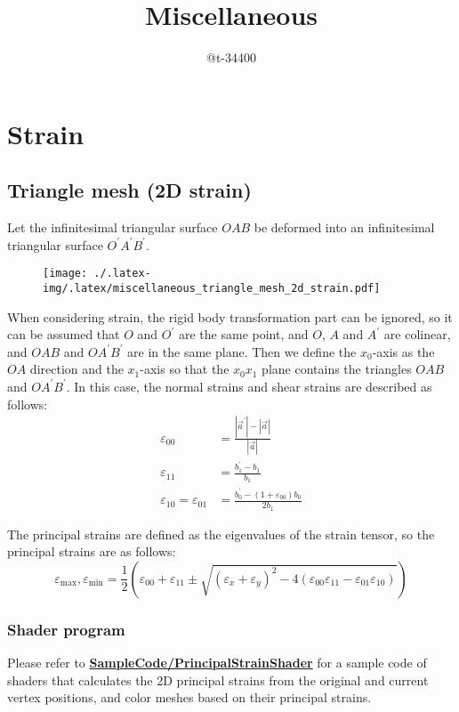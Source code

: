 \documentclass[]{article}
\title{Miscellaneous}
\author{@t-34400}
\theoremstyle{definition}
\begin{document}
\maketitle
\tableofcontents

\section{Strain}
\subsection{Triangle mesh (2D strain)}
Let the infinitesimal triangular surface $OAB$ be deformed into an infinitesimal triangular surface $O^\prime A^\prime B^\prime$. 
\begin{figure}[H]
    \centering
    \texttt{[image: ./.latex-img/.latex/miscellaneous\_triangle\_mesh\_2d\_strain.pdf]}
    \label{fig:infinitesimal_triangle_deformation_2d_strain}
\end{figure}
When considering strain, the rigid body transformation part can be ignored, so it can be assumed that $O$ and $O^\prime$ are the same point, and $O$, $A$ and $A^\prime$ are colinear, and $OAB$ and $O A^\prime B^\prime$ are in the same plane. 
Then we define the $x_0$-axis as the $OA$ direction and the $x_1$-axis so that the $x_0x_1$ plane contains the triangles $OAB$ and $OA^\prime B^\prime$.
In this case, the normal strains and shear strains are described as follows:
\begin{equation}
    \begin{aligned}
        \varepsilon_{00} &= \frac{|\vec{a}^\prime| - |\vec{a}|}{|\vec{a}|}\\
        \varepsilon_{11} &= \frac{b^\prime_1 - b_1}{b_1}\\
        \varepsilon_{10} = \varepsilon_{01} &= \frac{b^\prime_0 - (1+\varepsilon_{00})b_0}{2b_1}
    \end{aligned}
\end{equation}

The principal strains are defined as the eigenvalues of the strain tensor, so the principal strains are as follows:
\begin{equation}
    \varepsilon_{\mathrm{max}}, \varepsilon_{\mathrm{min}} = \frac{1}{2}\left(\varepsilon_{00} + \varepsilon_{11} \pm \sqrt{(\varepsilon_x + \varepsilon_y)^2 - 4(\varepsilon_{00}\varepsilon_{11}-\varepsilon_{01}\varepsilon_{10})}\right)    
\end{equation}

\subsubsection{Shader program}
Please refer to \href{https://github.com/t-34400/PhysicsAndMathematics/tree/main/SampleCode/PrincipalStrainShader}{\textbf{SampleCode/PrincipalStrainShader}} for a sample code of shaders that calculates the 2D principal strains from the original and current vertex positions, and color meshes based on their principal strains.
\end{document}
